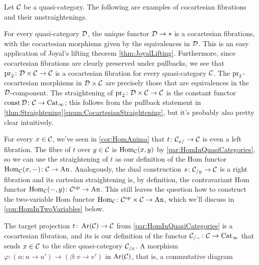 \begin{exm}\label{exm:Straightening}
	Let $\mathcal{C}$ be a quasi-category. The following are examples of cocartesian fibrations and their unstraightenings.
	\begin{alphanumerate}
		\item For every quasi-category $\mathcal{D}$, the unique functor $\mathcal{D}\rightarrow *$ is a cocartesian fibrations, with the cocartesian morphisms given by the equivalences in $\mathcal{D}$. This is an easy application of Joyal's lifting theorem \cref{thm:JoyalLifting}. Furthermore, since cocartesian fibrations are clearly preserved under pullbacks, we see that $\operatorname{pr}_2\colon \mathcal{D}\times \mathcal{C}\rightarrow\mathcal{C}$ is a cocartesian fibration for every quasi-category $\mathcal{C}$. The $\operatorname{pr}_2$-cocartesian morphisms in $\mathcal{D}\times\mathcal{C}$ are precisely those that are equivalences in the $\mathcal{D}$-component. The straightening of $\operatorname{pr}_2\colon \mathcal{D}\times \mathcal{C}\rightarrow\mathcal{C}$ is the constant functor $\operatorname{const} \mathcal{D}\colon \mathcal{C}\rightarrow \mathrm{Cat}_\infty$; this follows from the pullback statement in \cref{thm:Straightening}\cref{enum:CocartesianStraightening}, but it's probably also pretty clear intuitively.\label{enum:ProjectionsStraightenToConstantFunctors}
		\item For every $x\in \mathcal{C}$, we've seen in \cref{cor:HomAnima} that $t\colon \mathcal{C}_{x/}\rightarrow \mathcal{C}$ is even a left fibration. The fibre of $t$ over $y\in\mathcal{C}$ is $\operatorname{Hom}_{\mathcal{C}}(x,y)$ by \cref{par:HomInQuasiCategories}, so we can use the straightening of $t$ as our definition of the Hom functor $\operatorname{Hom}_{\mathcal{C}}(x,-)\colon \mathcal{C}\rightarrow \mathrm{An}$. Analogously, the dual construction $s\colon \mathcal{C}_{/y}\rightarrow \mathcal{C}$ is a right fibration and its cartesian straightening is, by definition, the contravariant Hom functor $\operatorname{Hom}_{\mathcal{C}}(-,y)\colon \mathcal{C}^{\mathrm{op}}\rightarrow \mathrm{An}$. This still leaves the question how to construct the two-variable Hom functor $\operatorname{Hom}_{\mathcal{C}}\colon \mathcal{C}^{\mathrm{op}}\times\mathcal{C}\rightarrow\mathrm{An}$, which we'll discuss in \cref{con:HomInTwoVariables} below.\label{enum:SliceLeftFibration}
		\item The target projection $t\colon \operatorname{Ar}(\mathcal{C})\rightarrow \mathcal{C}$ from \cref{par:HomInQuasiCategories} is a cocartesian fibration, and its is our definition of the functor $\mathcal{C}_{/-}\colon \mathcal{C}\rightarrow\mathrm{Cat}_\infty$ that sends $x\in\mathcal{C}$ to the slice quasi-category $\mathcal{C}_{/x}$. A morphism $\varphi\colon (\alpha\colon u\rightarrow u')\rightarrow (\beta\colon v\rightarrow v')$ in $\operatorname{Ar}(\mathcal{C})$, that is, a commutative diagram\label{enum:ArCocartesianFibration}
		\begin{equation*}
			\begin{tikzcd}

\end{tikzcd}
\end{equation*}
\end{alphanumerate}
\end{exm}

